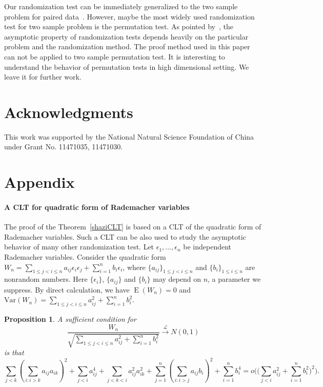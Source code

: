 \documentclass[review]{elsarticle}
\DeclareMathOperator{\myE}{E}
\theoremstyle{plain}
\newtheorem{proposition}{\quad\quad Proposition}
\theoremstyle{definition}
\theoremstyle{remark}
\begin{document}
Our randomization test can be immediately generalized to the two sample problem for paired data~\citep{Konietschke2014}.
However, maybe the most widely used randomization test for two sample problem is the permutation test.
As pointed by~\citet{Romano1990On}, the asymptotic property of randomization tests depends heavily on the particular problem and the randomization method.
The proof method used in this paper can not be applied to two sample permutation test.
 It is interesting to understand the behavior of permutation tests in high dimensional setting. We leave it for further work.


\section*{Acknowledgments}
{This work was supported by the National Natural Science Foundation of China under Grant No. 11471035, 11471030.
}

\section*{Appendix}
\paragraph{A CLT for quadratic form of Rademacher variables}
The proof of the Theorem~\ref{shaziCLT} is based on a CLT of the quadratic form of Rademacher variables. 
Such a CLT can be also used to study the asymptotic behavior of many other randomization test.
 Let $\epsilon_1,\ldots,\epsilon_n$ be independent Rademacher  variables. 
 Consider the quadratic form $W_n=\sum_{1\leq j<i\leq n} a_{ij}\epsilon_i \epsilon_j+\sum_{i=1}^n b_i \epsilon_i$, where $\{a_{ij}\}_{1\leq j <i \leq n}$ and $\{b_i\}_{1\leq i\leq n}$ are nonrandom numbers.
 Here $\{\epsilon_i\}$, $\{a_{ij}\}$ and $\{b_{i}\}$ may depend on $n$, a parameter we suppress.
 By direct calculation, we have $\myE(W_n)=0$ and $\mathrm{Var}(W_n)=\sum_{1\leq j<i\leq n} a_{ij}^2+\sum_{i=1}^n b_i^2$.

 \begin{proposition}\label{CLTprop}
     A sufficient condition for
     \begin{equation*}
         \frac{W_n}{\sqrt{\sum_{1\leq j<i\leq n} a_{ij}^2 +\sum_{i=1}^n b_i^2}}
         \xrightarrow{\mathcal{L}} N(0,1)
     \end{equation*}
     is that
     \begin{equation}\label{complC}
         \sum_{j<k}{(\sum_{i:i>k}a_{ij}a_{ik})}^2+
         \sum_{j<i}a_{ij}^4+
         \sum_{j<k<i}a_{ij}^2 a_{ik}^2
         +
     \sum_{j=1}^n (\sum_{i:i>j} a_{ij}b_i)^2 
         +
         \sum_{i=1}^n b_i^4
         =o\Big(\big(\sum_{j<i} a_{ij}^2+\sum_{i=1}^n b_i^2\big)^2\Big).
     \end{equation}
 \end{proposition}
\end{document}
